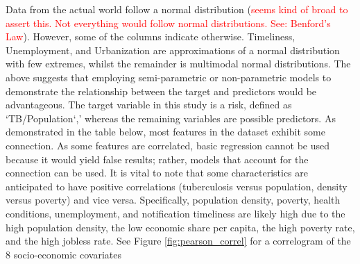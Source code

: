 Data from the actual world follow a normal distribution (\textcolor{red}{seems kind of broad to assert this. Not everything would follow normal distributions. See: Benford's Law}). However, some of the columns indicate otherwise. Timeliness, Unemployment, and Urbanization are approximations of a normal distribution with few extremes, whilst the remainder is multimodal normal distributions. The above suggests that employing semi-parametric or non-parametric models to demonstrate the relationship between the target and predictors would be advantageous. The target variable in this study is a risk, defined as `TB/Population`,' whereas the remaining variables are possible predictors. As demonstrated in the table below, most features in the dataset exhibit some connection. As some features are correlated, basic regression cannot be used because it would yield false results; rather, models that account for the connection can be used. It is vital to note that some characteristics are anticipated to have positive correlations (tuberculosis versus population, density versus poverty) and vice versa. Specifically, population density, poverty, health conditions, unemployment, and notification timeliness are likely high due to the high population density, the low economic share per capita, the high poverty rate, and the high jobless rate. See Figure \ref{fig:pearson_correl} for a correlogram of the 8 socio-economic covariates



